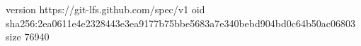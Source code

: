 version https://git-lfs.github.com/spec/v1
oid sha256:2ea0611e4e2328443e3ea9177b75bbe5683a7e340bebd904bd0c64b50ac06803
size 76940
